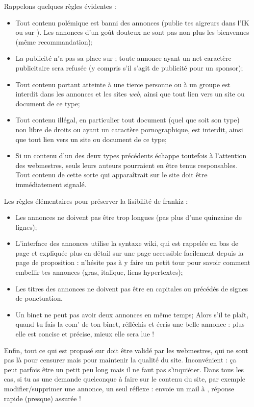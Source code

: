 Rappelons quelques r\`egles \'evidentes :
\begin{itemize}
 \item Tout contenu pol\'emique est banni des annonces (publie tes aigreurs dans l'IK ou sur ).
       Les annonces d'un go\^ut douteux ne sont pas non plus les bienvenues (m\^eme recommandation);
 \item La publicit\'e n'a pas sa place sur \fkz ; toute annonce ayant un net caract\`ere publicitaire
       sera refus\'ee (y compris s'il s'agit de publicit\'e pour un sponsor);
 \item Tout contenu portant atteinte \`a  une tierce personne ou \`a  un groupe est interdit dans les annonces
       et les sites \emph{web}, ainsi que tout lien vers un site ou document de ce type;
 \item Tout contenu ill\'egal, en particulier tout document (quel que soit son type)
       non libre de droits ou ayant un caract\`ere pornographique, est interdit,
       ainsi que tout lien vers un site ou document de ce type;
 \item Si un contenu d'un des deux types pr\'ec\'edents \'echappe toutefois \`a  l'attention des webmestres,
       seuls leurs auteurs pourraient en \^etre tenus responsables.
       Tout contenu de cette sorte qui appara\^itrait sur le site doit \^etre imm\'ediatement signal\'e.
\end{itemize}

Les r\`egles \'el\'ementaires pour pr\'eserver la lisibilit\'e de frankiz :
\begin{itemize}
 \item Les annonces ne doivent pas \^etre trop longues (pas plus d'une quinzaine de lignes);
 \item L'interface des annonces utilise la syntaxe wiki, qui est rappel\'ee en bas de page et expliqu\'ee plus en d\'etail
        sur une page accessible facilement depuis la page de proposition :
        n'h\'esite pas \`a  y faire un petit tour pour savoir comment embellir tes annonces
        (gras, italique, liens hypertextes);
 \item Les titres des annonces ne doivent pas \^etre en capitales ou pr\'ec\'ed\'es de signes de ponctuation.
 \item Un binet ne peut pas avoir deux annonces en m\^eme temps;
       Alors s'il te pla\^it, quand tu fais la com' de ton binet, r\'efl\'echis et \'ecris une belle annonce :
       plus elle est concise et pr\'ecise, mieux elle sera lue !
\end{itemize}

Enfin, tout ce qui est propos\'e sur \fkz doit \^etre valid\'e par les
webmestres, qui ne sont pas l\`a  pour censurer mais pour maintenir la
qualit\'e du site. Inconv\'enient : \c ca peut parfois \^etre un petit peu
long mais il ne faut pas s'inqui\'eter. Dans tous les cas, si tu as une
demande quelconque \`a  faire sur le contenu du site, par exemple
modifier/supprimer une annonce, un seul r\'eflexe : envoie un mail \`a 
, r\'eponse rapide (presque) assur\'ee !
